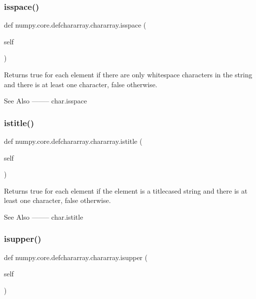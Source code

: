 \subsubsection{\texorpdfstring{isspace()}{isspace()}}
{\footnotesize\ttfamily def numpy.\+core.\+defchararray.\+chararray.\+isspace (\begin{DoxyParamCaption}\item[{}]{self }\end{DoxyParamCaption})}

\begin{DoxyVerb}Returns true for each element if there are only whitespace
characters in the string and there is at least one character,
false otherwise.

See Also
--------
char.isspace\end{DoxyVerb}
 \mbox{\label{classnumpy_1_1core_1_1defchararray_1_1chararray_a810bd28a787ccc98a71f341f2b60f251}} 
\subsubsection{\texorpdfstring{istitle()}{istitle()}}
{\footnotesize\ttfamily def numpy.\+core.\+defchararray.\+chararray.\+istitle (\begin{DoxyParamCaption}\item[{}]{self }\end{DoxyParamCaption})}

\begin{DoxyVerb}Returns true for each element if the element is a titlecased
string and there is at least one character, false otherwise.

See Also
--------
char.istitle\end{DoxyVerb}
 \mbox{\label{classnumpy_1_1core_1_1defchararray_1_1chararray_ab015e822025967f8172b8a40e7bf4fe0}} 
\subsubsection{\texorpdfstring{isupper()}{isupper()}}
{\footnotesize\ttfamily def numpy.\+core.\+defchararray.\+chararray.\+isupper (\begin{DoxyParamCaption}\item[{}]{self }\end{DoxyParamCaption})}

